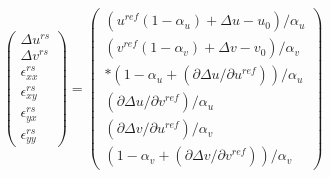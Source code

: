 \documentclass[
	a4paper, %
	10pt, %
	twoside, %
	french
]{LTJournalArticle}
\begin{document}
\begin{equation}
	\left(
		\begin{array}{c}
			\Delta u^{rs}\\
			\Delta v^{rs}\\
			\epsilon_{xx}^{rs}\\
			\epsilon_{xy}^{rs}\\
			\epsilon_{yx}^{rs}\\
			\epsilon_{yy}^{rs}
		\end{array}
	\right)
	=
	\left(
		\begin{array}{c}
			(u^{ref} (1 - \alpha_u) + \Delta u -u_0) / \alpha_u\\
			(v^{ref} (1 - \alpha_v) + \Delta v -v_0) / \alpha_v\\*
			(1 - \alpha_u + (\partial \Delta u / \partial u^{ref})) / \alpha_u\\
			(\partial \Delta u / \partial v^{ref}) / \alpha_u\\
			(\partial \Delta v / \partial u^{ref}) / \alpha_v\\
			(1 - \alpha_v + (\partial \Delta v / \partial v^{ref})) / \alpha_v
		\end{array}
	\right)
\end{equation}
\end{document}
